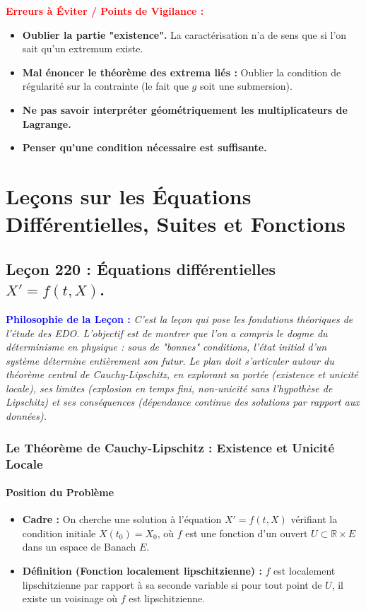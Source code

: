 \documentclass[12pt, a4paper, parskip=full]{report}
\theoremstyle{agregstyle}
\newenvironment{philosophie}
  {\par\medskip\noindent\begin{oframed}\noindent\textbf{\textcolor{blue}{Philosophie de la Leçon :}}\itshape}
  {\end{oframed}\par\medskip}
\newenvironment{erreurs}
  {\par\medskip\noindent\begin{oframed}\noindent\textbf{\textcolor{red}{Erreurs à Éviter / Points de Vigilance :}}}
  {\end{oframed}\par\medskip}
\begin{document}
\begin{erreurs}
    \begin{itemize}
        \item \textbf{Oublier la partie "existence".} La caractérisation n'a de sens que si l'on sait qu'un extremum existe.
        \item \textbf{Mal énoncer le théorème des extrema liés :} Oublier la condition de régularité sur la contrainte (le fait que $g$ soit une submersion).
        \item \textbf{Ne pas savoir interpréter géométriquement les multiplicateurs de Lagrange.}
        \item \textbf{Penser qu'une condition nécessaire est suffisante.}
    \end{itemize}
\end{erreurs}

\part{Leçons sur les Équations Différentielles, Suites et Fonctions}

\chapter{Leçon 220 : Équations différentielles $X'=f(t,X)$.}

\begin{philosophie}
    C'est la leçon qui pose les fondations théoriques de l'étude des EDO. L'objectif est de montrer que l'on a compris le dogme du déterminisme en physique : sous de "bonnes" conditions, l'état initial d'un système détermine entièrement son futur. Le plan doit s'articuler autour du théorème central de Cauchy-Lipschitz, en explorant sa portée (existence et unicité locale), ses limites (explosion en temps fini, non-unicité sans l'hypothèse de Lipschitz) et ses conséquences (dépendance continue des solutions par rapport aux données).
\end{philosophie}

\section{Le Théorème de Cauchy-Lipschitz : Existence et Unicité Locale}
\subsection{Position du Problème}
\begin{itemize}
    \item \textbf{Cadre :} On cherche une solution à l'équation $X'=f(t,X)$ vérifiant la condition initiale $X(t_0)=X_0$, où $f$ est une fonction d'un ouvert $U \subset \mathbb{R} \times E$ dans un espace de Banach $E$.
    \item \textbf{Définition (Fonction localement lipschitzienne) :} $f$ est localement lipschitzienne par rapport à sa seconde variable si pour tout point de $U$, il existe un voisinage où $f$ est lipschitzienne.
\end{itemize}
\end{document}
